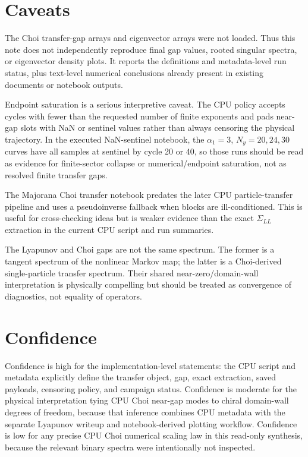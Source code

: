 \documentclass[aps,prb,onecolumn,nofootinbib,superscriptaddress]{revtex4-2}
\begin{document}
\section{Caveats}

The Choi transfer-gap arrays and eigenvector arrays were not loaded.  Thus this
note does not independently reproduce final gap values, rooted singular spectra,
or eigenvector density plots.  It reports the definitions and metadata-level run
status, plus text-level numerical conclusions already present in existing
documents or notebook outputs.

Endpoint saturation is a serious interpretive caveat.  The CPU policy accepts
cycles with fewer than the requested number of finite exponents and pads
near-gap slots with NaN or sentinel values rather than always censoring the
physical trajectory.  In the executed NaN-sentinel notebook, the $\alpha_1=3$,
$N_y=20,24,30$ curves have all samples at sentinel by cycle 20 or 40, so those
runs should be read as evidence for finite-sector collapse or numerical/endpoint
saturation, not as resolved finite transfer gaps.

The Majorana Choi transfer notebook predates the later CPU particle-transfer
pipeline and uses a pseudoinverse fallback when blocks are ill-conditioned.
This is useful for cross-checking ideas but is weaker evidence than the exact
$\Sigma_{LL}$ extraction in the current CPU script and run summaries.

The Lyapunov and Choi gaps are not the same spectrum.  The former is a tangent
spectrum of the nonlinear Markov map; the latter is a Choi-derived
single-particle transfer spectrum.  Their shared near-zero/domain-wall
interpretation is physically compelling but should be treated as convergence of
diagnostics, not equality of operators.

\section{Confidence}

Confidence is high for the implementation-level statements: the CPU script and
metadata explicitly define the transfer object, gap, exact extraction, saved
payloads, censoring policy, and campaign status.  Confidence is moderate for
the physical interpretation tying CPU Choi near-gap modes to chiral domain-wall
degrees of freedom, because that inference combines CPU metadata with the
separate Lyapunov writeup and notebook-derived plotting workflow.  Confidence is
low for any precise CPU Choi numerical scaling law in this read-only synthesis,
because the relevant binary spectra were intentionally not inspected.
\end{document}
